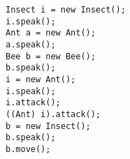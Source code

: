 \ifprintanswers\else
\begin{lstlisting}
Insect i = new Insect();
i.speak();
Ant a = new Ant();
a.speak();
Bee b = new Bee();
b.speak();
i = new Ant();
i.speak();
i.attack();
((Ant) i).attack();
b = new Insect();
b.speak();
b.move();
\end{lstlisting}
\fi
